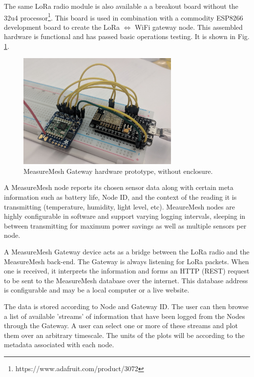 \documentclass{IEEEtran}
\begin{document}
The same LoRa radio module is also available a a breakout board without the 32u4 processor\footnote{https://www.adafruit.com/product/3072}. This board is used in combination with a commodity ESP8266 development board to create the LoRa $\Longleftrightarrow$ WiFi gateway node. This assembled hardware is functional and has passed basic operations testing. It is shown in Fig. \ref{fig:gatewayproto}.

\begin{figure}
    \centering
    \includegraphics[width=8cm]{images/gatewayPrototype.jpg}
    \caption{MeasureMesh Gateway hardware prototype, without enclosure.}
    \label{fig:gatewayproto}
\end{figure}

A MeasureMesh node reports its chosen sensor data along with certain meta information such as battery life, Node ID, and the context of the reading it is transmitting (temperature, humidity, light level, etc). MeaureMesh nodes are highly configurable in software and support varying logging intervals, sleeping in between transmitting for maximum power savings as well as multiple sensors per node. 

A MeasureMesh Gateway device acts as a bridge between the LoRa radio and the MeasureMesh back-end. The Gateway is always listening for LoRa packets. When one is received, it interprets the information and forms an HTTP (REST) request to be sent to the MeasureMesh database over the internet. This database address is configurable and may be a local computer or a live website.

The data is stored according to Node and Gateway ID. The user can then browse  a list of available 'streams' of information that have been logged from the Nodes through the Gateway. A user can select one or more of these streams and plot them over an arbitrary timescale. The units of the plots will be according to the metadata associated with each node. 


\end{document}
